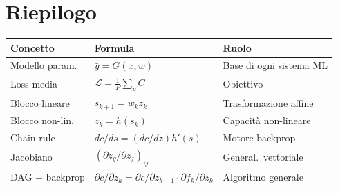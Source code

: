 \section{Riepilogo}
\label{sec:summary-ch0}

\begin{center}
\begin{tabular}{lll}
  \toprule
  \textbf{Concetto} & \textbf{Formula} & \textbf{Ruolo} \\
  \midrule
  Modello param.  & $\bar{y}=G(x,w)$                  & Base di ogni sistema ML \\
  Loss media      & $\mathcal{L}=\frac{1}{P}\sum_p C$  & Obiettivo \\
  Blocco lineare  & $s_{k+1}=w_k z_k$                  & Trasformazione affine \\
  Blocco non-lin. & $z_k=h(s_k)$                       & Capacità non-lineare \\
  Chain rule      & $dc/ds=(dc/dz)h'(s)$               & Motore backprop \\
  Jacobiano       & $(\partial z_g/\partial z_f)_{ij}$  & General.\ vettoriale \\
  DAG + backprop  & $\partial c/\partial z_k = \partial c/\partial z_{k+1}\cdot\partial f_k/\partial z_k$ & Algoritmo generale \\
  \bottomrule
\end{tabular}
\end{center}
